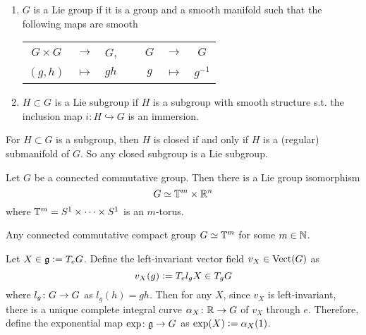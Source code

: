 \documentclass[a4paper,12pt]{article}
\begin{document}
	\begin{defn}
		\begin{enumerate}
			\item $G$ is a Lie group if it is a group and a smooth manifold such that the following maps are smooth
			\begin{center}
				\begin{tabular}{ccccccc}
					$G \times G$ & $\rightarrow$ & $G$,&~& $G$ & $\rightarrow$ & $G$\\
					$(g,h)$ & $\mapsto$ & $gh$ & ~&$g$& $\mapsto$ & $g^{-1}$
				\end{tabular}
			\end{center}
			\item $H \subset G$ is a Lie subgroup if $H$ is a subgroup with smooth structure s.t. the inclusion map $i \colon H \hookrightarrow G$ is an immersion.
		\end{enumerate}
	\end{defn}
	\begin{rem}
		For $H \subset G$ is a subgroup, then $H$ is closed if and only if $H$ is a (regular) submanifold of $G$. So any closed subgroup is a Lie subgroup.
	\end{rem}
	\begin{thm}
		Let $G$ be a connected commutative group. Then there is a Lie group isomorphism
		\begin{equation*}
			G \simeq \mathbb{T}^m \times \mathbb{R}^n
		\end{equation*}
		where $\mathbb{T}^m = S^1 \times \cdots \times S^1$ is an $m$-torus.
	\end{thm}
	\begin{cor}
		Any connected commutative compact group $G \simeq \mathbb{T}^m$ for some $m \in \mathbb{N}$.
	\end{cor}
	Let $X \in \mathfrak{g} \vcentcolon= T_eG$. Define the left-invariant vector field $v_{X} \in \operatorname{Vect}(G)$ as
	\begin{equation*}
		v_{X}(g) \vcentcolon= T_el_gX \in T_gG
	\end{equation*}
	where $l_g \colon G \rightarrow G$ as $l_g(h) = gh$. Then for any $X$, since $v_{X}$ is left-invariant, there is a unique complete integral curve $\alpha_{X} \colon \mathbb{R} \rightarrow G$ of $v_{X}$ through $e$. Therefore, define the exponential map $\exp \colon \mathfrak{g} \rightarrow G$ as $\exp(X) \vcentcolon= \alpha_{X}(1)$.
\end{document}
